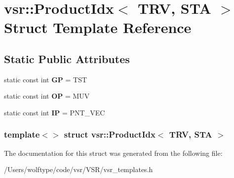 \hypertarget{structvsr_1_1_product_idx_3_01_t_r_v_00_01_s_t_a_01_4}{\section{vsr\-:\-:Product\-Idx$<$ T\-R\-V, S\-T\-A $>$ Struct Template Reference}
\label{structvsr_1_1_product_idx_3_01_t_r_v_00_01_s_t_a_01_4}
}
\subsection*{Static Public Attributes}
\begin{DoxyCompactItemize}
\item 
\hypertarget{structvsr_1_1_product_idx_3_01_t_r_v_00_01_s_t_a_01_4_a09ff59976f15f971e6bbbed45164e5b4}{static const int {\bfseries G\-P} = T\-S\-T}\label{structvsr_1_1_product_idx_3_01_t_r_v_00_01_s_t_a_01_4_a09ff59976f15f971e6bbbed45164e5b4}

\item 
\hypertarget{structvsr_1_1_product_idx_3_01_t_r_v_00_01_s_t_a_01_4_a48c7cf8e93fb343b5156d8a983c58d91}{static const int {\bfseries O\-P} = M\-U\-V}\label{structvsr_1_1_product_idx_3_01_t_r_v_00_01_s_t_a_01_4_a48c7cf8e93fb343b5156d8a983c58d91}

\item 
\hypertarget{structvsr_1_1_product_idx_3_01_t_r_v_00_01_s_t_a_01_4_a20b14322efbef3d36defb9808162fab6}{static const int {\bfseries I\-P} = P\-N\-T\-\_\-\-V\-E\-C}\label{structvsr_1_1_product_idx_3_01_t_r_v_00_01_s_t_a_01_4_a20b14322efbef3d36defb9808162fab6}

\end{DoxyCompactItemize}
\subsubsection*{template$<$$>$ struct vsr\-::\-Product\-Idx$<$ T\-R\-V, S\-T\-A $>$}



The documentation for this struct was generated from the following file\-:\begin{DoxyCompactItemize}
\item 
/\-Users/wolftype/code/vsr/\-V\-S\-R/vsr\-\_\-templates.\-h\end{DoxyCompactItemize}
